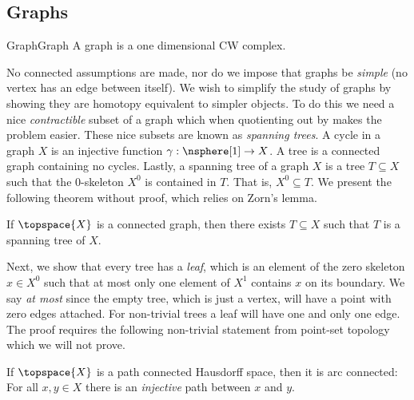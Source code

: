 \documentclass{book}                                                           %
\begin{document}
            \subsection{Graphs}
                \begin{fdefinition}{Graph}{Graph}
                    A graph is a one dimensional CW complex.
                \end{fdefinition}
                No connected assumptions are made, nor do we impose that graphs
                be \textit{simple} (no vertex has an edge between itself). We
                wish to simplify the study of graphs by showing they are
                homotopy equivalent to simpler objects. To do this we need a
                nice \textit{contractible} subset of a graph which when
                quotienting out by makes the problem easier. These nice subsets
                are known as \textit{spanning trees}. A cycle in a graph $X$ is
                an injective function $\gamma:\nsphere[1]\rightarrow{X}$. A tree
                is a connected graph containing no cycles. Lastly, a spanning
                tree of a graph $X$ is a tree $T\subseteq{X}$ such that the
                0-skeleton $X^{0}$ is contained in $T$. That is,
                $X^{0}\subseteq{T}$. We present the following theorem without
                proof, which relies on Zorn's lemma.
                \begin{theorem}
                    If $\topspace{X}$ is a connected graph, then there exists
                    $T\subseteq{X}$ such that $T$ is a spanning tree of $X$.
                \end{theorem}
                Next, we show that every tree has a \textit{leaf}, which is an
                element of the zero skeleton $x\in{X}^{0}$ such that at most
                only one element of $X^{1}$ contains $x$ on its boundary. We say
                \textit{at most} since the empty tree, which is just a vertex,
                will have a point with zero edges attached. For non-trivial
                trees a leaf will have one and only one edge. The proof requires
                the following non-trivial statement from point-set topology
                which we will not prove.
                \begin{theorem}
                    If $\topspace{X}$ is a path connected Hausdorff space, then
                    it is arc connected: For all $x,y\in{X}$ there is an
                    \textit{injective} path between $x$ and $y$.
                \end{theorem}
\end{document}
